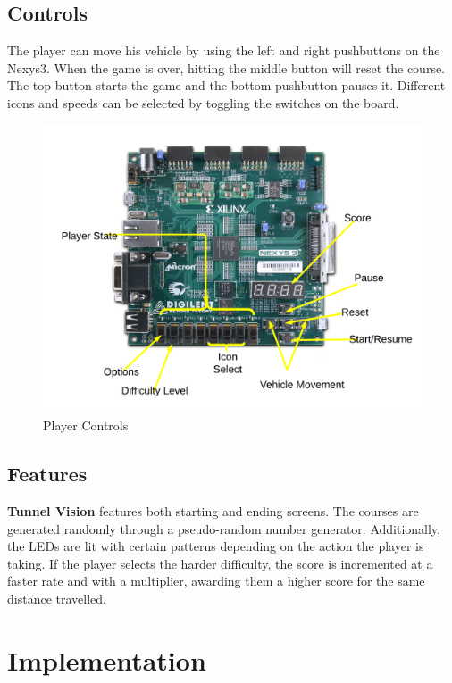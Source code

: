 \documentclass[11pt]{article}
\begin{document}
\subsection{Controls}
The player can move his vehicle by using the left and right pushbuttons on the Nexys3. When the game is over, hitting the middle button will reset the course. The top button starts the game and the bottom pushbutton pauses it. Different icons and speeds can be selected by toggling the switches on the board.

		\begin{figure}[h]\centering
		\includegraphics[height=0.8\textwidth, width=0.8\textheight]{Images/controls_mockup.png}
		\caption{Player Controls}
			\label{controls}
		\end{figure}	
	 	

\subsection{Features}
\textbf{Tunnel Vision} features both starting and ending screens. The courses are generated randomly through a pseudo-random number generator. Additionally, the LEDs are lit with certain patterns depending on the action the player is taking. If the player selects the harder difficulty, the score is incremented at a faster rate and with a multiplier, awarding them a higher score for the same distance travelled.	

\section{Implementation}
\end{document}
